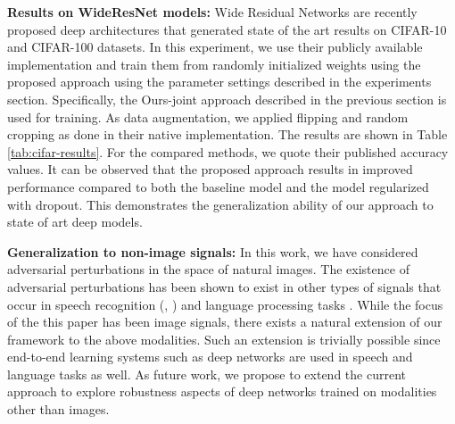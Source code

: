 \textbf{Results on WideResNet models:} Wide Residual Networks are recently proposed deep architectures that generated state of the art results on CIFAR-10 and CIFAR-100 datasets. In this experiment, we use their publicly available implementation and train them from randomly initialized weights using the proposed approach using the parameter settings described in the experiments section. Specifically, the Ours-joint approach described in the previous section is used for training. As data augmentation, we applied flipping and random cropping as done in their native implementation. The results are shown in Table \ref{tab:cifar-results}. For the compared methods, we quote their published accuracy values. It can be observed that the proposed approach results in improved performance compared to both the baseline model and the model regularized with dropout. This demonstrates the generalization ability of our approach to state of art deep models. 
\begin{center}
\label{tab:cifar-results}
\end{center}

\textbf{Generalization to non-image signals:}
In this work, we have considered adversarial perturbations in the space of natural images. The existence of adversarial perturbations has been shown to exist in other types of signals that occur in speech recognition (\cite{serdyuk2016invariant}, \cite{carlini_speech}) and language processing tasks \cite{miyato_NLP}. While the focus of the this paper has been image signals, there exists a natural extension of our framework to the above modalities. Such an extension is trivially possible since end-to-end learning systems such as deep networks are used in speech and language tasks as well. As future work, we propose to extend the current approach to explore robustness aspects of deep networks trained on modalities other than images.

